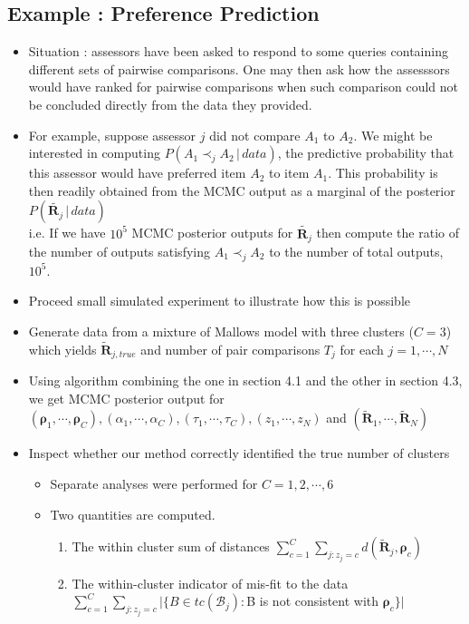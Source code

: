 \documentclass[12pt]{article}
\begin{document}
\subsection{Example : Preference Prediction}
\begin{itemize}
    \item Situation : assessors have been asked to respond to some queries containing different sets of pairwise comparisons. One may then ask how the assesssors would have ranked for pairwise comparisons when such comparison could not be concluded directly from the data they provided. 
    \item For example, suppose assessor $j$ did not compare $A_1$ to $A_2$. We might be interested in computing $P(A_1\prec_j A_2 \,|\, data)$, the predictive probability that this assessor would have preferred item $A_2$ to item $A_1$. This probability is then readily obtained from the MCMC output as a marginal of the posterior $P(\tilde{\mathbf{R}_j}\,|\,data)$ \\ i.e. If we have $10^5$ MCMC posterior outputs for $\tilde{\mathbf{R}_j}$ then compute the ratio of the number of outputs satisfying $A_1\prec_j A_2$ to the number of total outputs, $10^5$. 
    \item Proceed small simulated experiment to illustrate how this is possible
    \item Generate data from a mixture of Mallows model with three clusters ($C=3$) which yields $\tilde{\mathbf{R}}_{j,true}$ and number of pair comparisons $T_j$ for each $j=1, \cdots, N$
    \item Using algorithm combining the one in section 4.1 and the other in section 4.3, we get MCMC posterior output for $(\boldsymbol{\rho}_1, \cdots, \boldsymbol{\rho}_C), (\alpha_1, \cdots, \alpha_C), (\tau_1, \cdots, \tau_C), (z_1, \cdots, z_N)$ and $(\tilde{\mathbf{R}}_1, \cdots, \tilde{\mathbf{R}}_N)$
    \item Inspect whether our method correctly identified the true number of clusters
    \begin{itemize}
        \item Separate analyses were performed for $C=1,2,\cdots, 6$
        \item Two quantities are computed.
        \begin{enumerate}
            \item The within cluster sum of distances $\sum_{c=1}^C \sum_{j : z_j=c} d(\tilde{\mathbf{R}}_j, \boldsymbol{\rho}_c)$
            \item The within-cluster indicator of mis-fit to the data \\$\sum_{c=1}^C \sum_{j : z_j=c} \big|\{B\in tc(\mathcal{B}_j):$B is not consistent with $\boldsymbol{\rho}_c\} \big|$

\end{enumerate}
\end{itemize}
\end{itemize}
\end{document}
